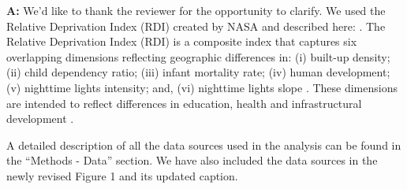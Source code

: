\documentclass[12pt,a4paper,oneside, reqno]{amsart}
\begin{document}
\setlength{\leftskip}{1cm}\textbf{A:} We'd like to thank the reviewer for the opportunity to clarify. We used the Relative Deprivation Index (RDI) created by NASA and described here: \parencite{RDI2022}. The Relative Deprivation Index (RDI) is a composite index that captures six overlapping dimensions reflecting geographic differences in: (i) built-up density; (ii) child dependency ratio; (iii) infant mortality rate; (iv) human development; (v) nighttime lights intensity; and, (vi) nighttime lights slope \parencite{RDI2022}. These dimensions are intended to reflect differences in education, health and infrastructural development \parencite{RDI2022}.

A detailed description of all the data sources used in the analysis can be found in the ``Methods - Data'' section. We have also included the data sources in the newly revised Figure 1 and its updated caption.
\end{document}
